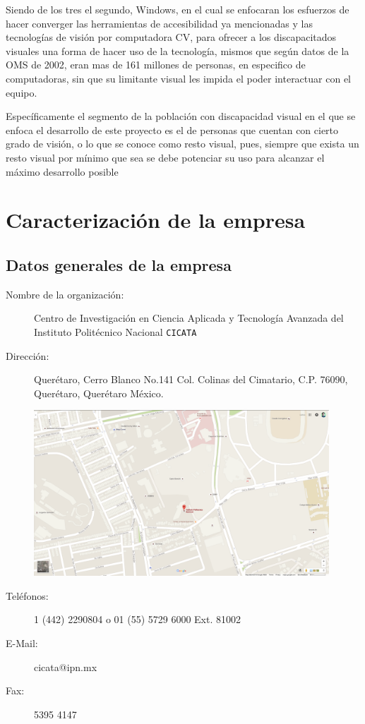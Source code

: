 \documentclass[12pt]{book} %
\begin{document}
	Siendo de los tres el segundo, Windows, en el cual se enfocaran los esfuerzos de hacer converger las herramientas de
	accesibilidad ya mencionadas y las tecnologías de visión por computadora CV, para ofrecer a los discapacitados 
	visuales una forma de hacer uso de la tecnología, mismos que según datos de la OMS de 2002, eran mas de 161 millones
	de personas, en especifico de computadoras, sin que su limitante visual les impida el poder interactuar con el 
	equipo.
	
	Específicamente el segmento de la población con discapacidad visual en el que se enfoca el desarrollo de este
	proyecto es el de personas que cuentan con cierto grado de visión, o lo que se conoce como resto visual, pues,
	siempre que exista un resto visual por mínimo que sea se debe potenciar su uso para alcanzar el máximo desarrollo
	posible

\newpage 
\section{Caracterización de la empresa}
	\subsection{Datos generales de la empresa}
	\begin{description}
		\item[Nombre de la organización:] Centro de Investigación en Ciencia Aplicada y Tecnología Avanzada del
			 Instituto Politécnico Nacional \texttt{CICATA}
			 
		\item[Dirección:] Querétaro, Cerro Blanco No.141 Col. Colinas del Cimatario, C.P. 76090, Querétaro, Querétaro
			 México.
			 \begin{center}
			 	\includegraphics[width=0.9\textwidth]{./imagenes/cicata}
			 \end{center}
		\item[Teléfonos:] 1 (442) 2290804 o 01 (55) 5729 6000 Ext. 81002
		\item[E-Mail:] cicata@ipn.mx 
		\item[Fax:] 5395 4147
	\end{description}
\end{document}
